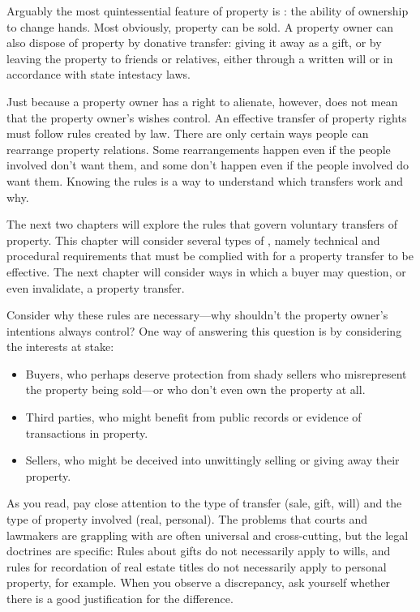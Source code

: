 Arguably the most quintessential feature of property is : the
ability of ownership to change hands. Most obviously, property can be sold. A
property owner can also dispose of property by donative transfer: giving it away
as a gift, or by leaving the property to friends or relatives, either through a
written will or in accordance with state intestacy laws.

Just because a property owner has a right to alienate, however, does not mean
that the property owner's wishes control. An effective transfer of property
rights must follow rules created by law.  There are only certain ways people can
rearrange property relations.  Some rearrangements happen even if the people
involved don't want them, and some don't happen even if the people involved do
want them.  Knowing the rules is a way to understand which transfers work and
why.

The next two chapters will explore the rules that govern voluntary transfers of
property. This chapter will consider several types of , namely
technical and procedural requirements that must be complied with for a property
transfer to be effective. The next chapter will consider ways in which a buyer
may question, or even invalidate, a property transfer.

Consider why these rules are necessary---why shouldn't the property owner's
intentions always control? One way of answering this question is by considering
the interests at stake:
\begin{itemize}
\item Buyers, who perhaps deserve protection from shady sellers
who misrepresent the property being sold---or who don't even own the property at
all.
\item Third parties, who might benefit from public records or evidence of
transactions in property.
\item Sellers, who might be deceived into unwittingly selling or giving away
their property.
\end{itemize}

As you read, pay close attention to the type of transfer (sale, gift, will) and
the type of property involved (real, personal). The problems that courts and
lawmakers are grappling with are often universal and cross-cutting, but the
legal doctrines are specific: Rules about gifts do not necessarily apply to
wills, and rules for recordation of real estate titles do not necessarily apply
to personal property, for example. When you observe a discrepancy, ask yourself
whether there is a good justification for the difference.
